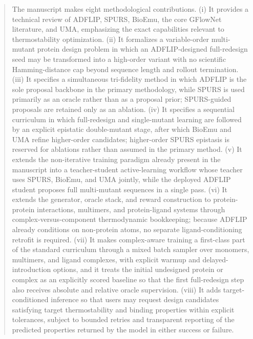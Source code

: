\documentclass[11pt]{article}
\begin{document}
\begin{abstract}
The manuscript makes eight methodological contributions. (i) It provides a technical review of ADFLIP, SPURS, BioEmu, the core GFlowNet literature, and UMA, emphasizing the exact capabilities relevant to thermostability optimization. (ii) It formalizes a variable-order multi-mutant protein design problem in which an ADFLIP-designed full-redesign seed may be transformed into a high-order variant with no scientific Hamming-distance cap beyond sequence length and rollout termination. (iii) It specifies a simultaneous tri-fidelity method in which ADFLIP is the sole proposal backbone in the primary methodology, while SPURS is used primarily as an oracle rather than as a proposal prior; SPURS-guided proposals are retained only as an ablation. (iv) It specifies a sequential curriculum in which full-redesign and single-mutant learning are followed by an explicit epistatic double-mutant stage, after which BioEmu and UMA refine higher-order candidates; higher-order SPURS epistasis is reserved for ablations rather than assumed in the primary method. (v) It extends the non-iterative training paradigm already present in the manuscript into a teacher-student active-learning workflow whose teacher uses SPURS, BioEmu, and UMA jointly, while the deployed ADFLIP student proposes full multi-mutant sequences in a single pass. (vi) It extends the generator, oracle stack, and reward construction to protein-protein interactions, multimers, and protein-ligand systems through complex-versus-component thermodynamic bookkeeping; because ADFLIP already conditions on non-protein atoms, no separate ligand-conditioning retrofit is required. (vii) It makes complex-aware training a first-class part of the standard curriculum through a mixed batch sampler over monomers, multimers, and ligand complexes, with explicit warmup and delayed-introduction options, and it treats the initial undesigned protein or complex as an explicitly scored baseline so that the first full-redesign step also receives absolute and relative oracle supervision. (viii) It adds target-conditioned inference so that users may request design candidates satisfying target thermostability and binding properties within explicit tolerances, subject to bounded retries and transparent reporting of the predicted properties returned by the model in either success or failure.


\end{abstract}
\end{document}
